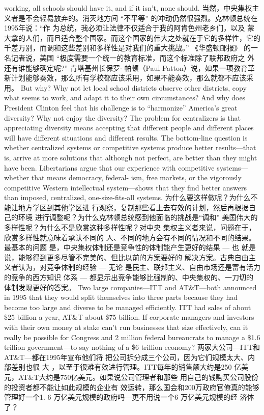 \begin{paracol}{2}
working, all schools should have it, and if it isn't, none should.
\switchcolumn
当然，中央集权主义者是不会轻易放弃的。消灭地方间
“不平等” 的冲动仍然很强烈。克林顿总统在1995年说：“作
为总统，我必须让法律不仅适合于我的阿肯色州老乡们，以及
蒙大拿的人们，而且适合整个国家。而这个国家的伟大之处就在于它的多样性，它的千差万别，而调和这些差别和多样性是对我们的重大挑战。” 《华盛顿邮报》 的一名记者说，美国
“极度需要一个统一的教育标准，而这个标准除了联邦政府之
外还有谁能够确定呢?” 肯塔基州长保罗$\cdot$ 帕顿（Paul Patton）说，如果一项教育革新计划能够奏效，那么所有学校都应该采用，如果不能奏效，那么就都不应该采用。
\switchcolumn
But why? Why not let local school districts observe other
districts, copy what seems to work, and adapt it to their own
circumstances? And why does President Clinton feel that his
challenge is to ``harmonize'' America's great diversity? Why not
enjoy the diversity? The problem for centralizers is that appreciating diversity means accepting that different people and different places will have different situations and different results.
The bottom-line question is whether centralized systems or
competitive systems produce better results---that is, arrive at
more solutions that although not perfect, are better than they
might have been. Libertarians argue that our experience with
competitive systems---whether that means democracy, federal-
ism, free markets, or the vigorously competitive Western intellectual system---shows that they find better answers than
imposed, centralized, one-size-fits-all systems.
\switchcolumn
为什么要这样做呢？为什么不能让地方学区到其他学区进
行观察，复制那些看上去有效的计划，然后再根据自己的环境
进行调整呢？为什么克林顿总统感到他面临的挑战是“调和”
美国伟大的多样性呢？为什么不是欣赏这种多样性呢？对中央
集权主义者来说，问题在于，欣赏多样性就意味着承认不同的
人、不同的地方会有不同的情况和不同的结果。最基本的问题
是，中央集权体制还是竞争性的体制能产生更好的结果 --- 也
就是说，能够得到更多尽管不完美的、但比以前的方案要好的
解决方案。古典自由主义者认为，对竞争体制的经验 --- 无论
是民主、联邦主义、自由市场还是富有活力的竞争的西方知识
体系 --- 都显示出竞争能够比强制的、中央集权的、一刀切的
体制发现更好的答案。
\switchcolumn*
Two large companies---ITT and AT\&T---both announced in 1995 that they would split themselves into three parts because
they had become too large and diverse to be managed efficiently. ITT had sales of about \$25 billion a year, AT\&T about
\$75 billion. If corporate managers and investors with their own
money at stake can't run businesses that size effectively, can it
really be possible for Congress and 2 million federal bureaucrats
to manage a \$1.6 trillion government---to say nothing of a \$6
trillion economy?
\switchcolumn
两家大公司---ITT和 AT\&T---都在1995年宣布他们将
把公司拆分成三个公司，因为它们规模太大、内部差别也很
大 ，以至于很难有效进行管理。ITT每年的销售额大约是250
亿美元，AT\&T大约是750亿美元。如果说公司管理者和那些
用自己的钱购买公司股份的投资者都不能让如此规模的企业有
效运转，那么国会和200万政府官僚真的能够管理好一个1. 6
万亿美元规模的政府吗---更不用说一个6 万亿美元规模的经
济体了？


\end{paracol}
